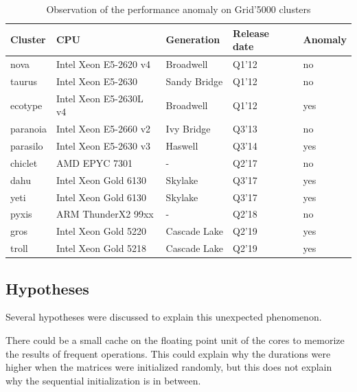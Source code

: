         \begin{table}[htbp]
            \caption{\label{tab:bit-flips}
            Observation of the  performance anomaly on Grid'5000 clusters}
            \centering
            \begin{tabular}{lllll}
                \toprule
                Cluster & CPU & Generation & Release date & Anomaly\\
                \midrule
                nova & Intel Xeon E5-2620 v4 & Broadwell & Q1'12 & no\\
                taurus & Intel Xeon E5-2630 & Sandy Bridge & Q1'12 & no\\
                ecotype & Intel Xeon E5-2630L v4 & Broadwell & Q1'12 &yes\\
                paranoia & Intel Xeon E5-2660 v2 & Ivy Bridge & Q3'13 & no\\
                parasilo & Intel Xeon E5-2630 v3 & Haswell & Q3'14 & yes\\
                chiclet & AMD EPYC 7301 & - & Q2'17 & no\\
                dahu & Intel Xeon Gold 6130 & Skylake & Q3'17 & yes\\
                yeti & Intel Xeon Gold 6130 & Skylake & Q3'17 &yes\\
                pyxis & ARM ThunderX2 99xx & - & Q2'18 & no\\
                gros & Intel Xeon Gold 5220 & Cascade Lake & Q2'19 & yes\\
                troll & Intel Xeon Gold 5218 & Cascade Lake & Q2'19 & yes\\
                \bottomrule
            \end{tabular}
        \end{table}

        \subsection{Hypotheses}
            Several hypotheses were discussed to explain this unexpected phenomenon.

            There could be a small cache  on the floating point unit of the cores to memorize the results of frequent
            operations. This could explain why the durations were higher when the matrices were initialized randomly,
            but this does not explain why the sequential initialization is in between.

